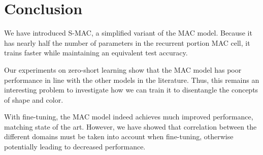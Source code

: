 \section{Conclusion}
\label{sec:conclusion}


We have introduced S-MAC, a simplified variant of the MAC model. Because it has nearly half the number of parameters in the recurrent portion MAC cell, it trains faster while maintaining an equivalent test accuracy. 

Our experiments on zero-short learning show that the MAC model has poor performance in line with the other models in the literature. Thus, this remains an interesting problem to investigate how we can train it to disentangle the concepts of shape and color.

With fine-tuning, the MAC model indeed achieves much improved performance, matching state of the art. However, we have showed that correlation between the different domains must be taken into account when fine-tuning, otherwise potentially leading to decreased performance.